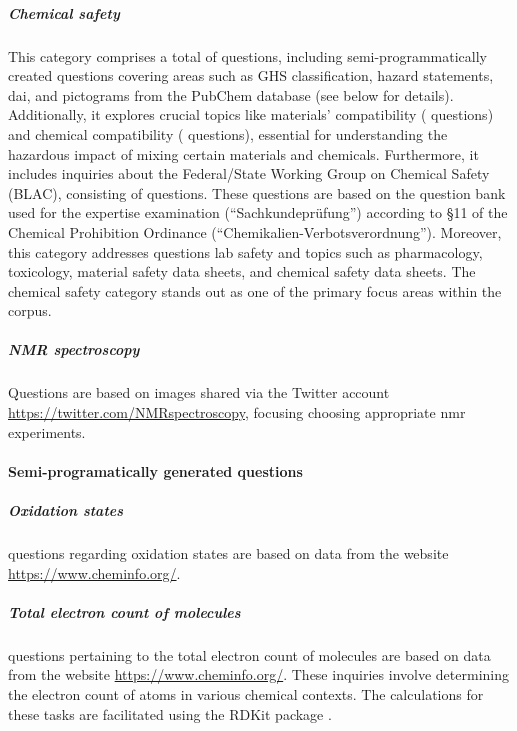\documentclass[11pt, oneside]{article}
\begin{document}
\begin{refsection}
\subparagraph{Chemical safety} 
This category comprises a total of  questions, including semi-programmatically created questions covering areas such as GHS classification, hazard statements, \gls{dai}, and pictograms from the PubChem database \autocite{pubchem} (see below for details). 
Additionally, it explores crucial topics like materials' compatibility ( questions) and chemical compatibility ( questions), essential for understanding the hazardous impact of mixing certain materials and chemicals. 
Furthermore, it includes inquiries about the Federal/State Working Group on Chemical Safety (BLAC), consisting of  questions. 
These questions are based on the question bank used for the expertise examination (\enquote{Sachkundeprüfung}) according to §11 of the Chemical Prohibition Ordinance (\enquote{Chemikalien-Verbotsverordnung}).
Moreover, this category addresses questions lab safety and topics such as pharmacology, toxicology, material safety data sheets, and chemical safety data sheets. 
The chemical safety category stands out as one of the primary focus areas within the \chembench corpus.

\subparagraph{NMR spectroscopy}
Questions are based on images shared via the Twitter account \url{https://twitter.com/NMRspectroscopy}, focusing choosing appropriate \gls{nmr} experiments.


\paragraph{Semi-programatically generated questions}

\subparagraph{Oxidation states}
 questions regarding oxidation states are based on data from the website \url{https://www.cheminfo.org/}. 

\subparagraph{Total electron count of molecules}
 questions pertaining to the total electron count of molecules are based on data from the website \url{https://www.cheminfo.org/}. 
These inquiries involve determining the electron count of atoms in various chemical contexts. The calculations for these tasks are facilitated using the RDKit package \autocite{rdkit}.


\end{refsection}
\end{document}
